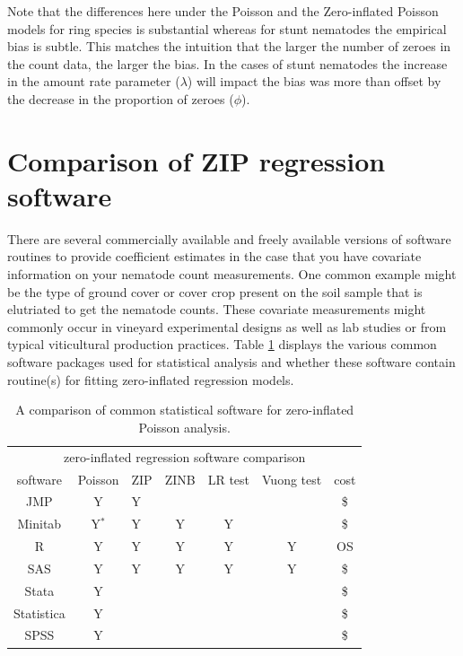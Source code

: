 \documentclass{article}
\begin{document}
Note that the differences here under the Poisson and the Zero-inflated Poisson models for ring species is substantial whereas for stunt nematodes the empirical bias is subtle. This matches the intuition that the larger the number of zeroes in the count data, the larger the bias. In the cases of stunt nematodes the increase in the amount rate parameter ($\lambda$) will impact the bias was more than offset by the decrease in the proportion of zeroes ($\phi$). 

\section{Comparison of ZIP regression software}\label{sec:zip_soft}
There are several commercially available and freely available versions of software routines to provide coefficient estimates in the case that you have covariate information on your nematode count measurements. One common example might be the type of ground cover or cover crop present on the soil sample that is elutriated to get the nematode counts. These covariate measurements might commonly occur in vineyard experimental designs as well as lab studies or from typical viticultural production practices. Table \ref{tab:software} displays the various common software packages used for statistical analysis and whether these software contain routine(s) for fitting zero-inflated regression models. 

\begin{table}
 \label{tab:software}
\begin{center}
\begin{tabular}{c | c l c | c | c | c  }
\hline
\multicolumn{7}{c}{zero-inflated regression software comparison} \\
\cline{1-7}
software & Poisson & ZIP  & ZINB & LR test & Vuong test & cost \\
\hline
JMP & Y  & Y & & & & \$ \\
Minitab & Y$^*$ &Y &Y  & Y&& \$ \\
R & Y  & Y & Y& Y&Y& OS \\
SAS & Y & Y & Y& Y&Y& \$ \\
Stata & Y &  & & & & \$ \\
Statistica & Y &  & & & & \$ \\
SPSS & Y &  & & && \$ \\
\hline
\end{tabular}
\end{center}
\caption{A comparison of common statistical software for zero-inflated Poisson analysis. }
\end{table}
\end{document}
